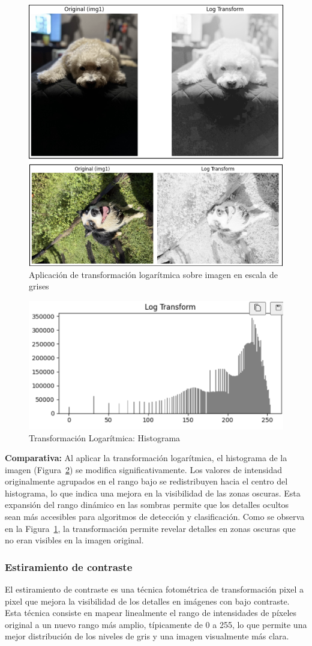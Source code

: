 \documentclass[12pt,letterpaper]{article}
\begin{document}
\begin{figure}[H]
  \centering
  \includegraphics[width=0.5\linewidth]{figuras/transformacion_log.png}
  \caption{Aplicación de transformación logarítmica sobre imagen en escala de grises}
  \label{fig:transformacion_logaritmica}
\end{figure}

\begin{figure}[H]
  \centering
  \includegraphics[width=0.5\linewidth]{figuras/histograma_transformacion_logaritmica.png}
  \caption{Transformación Logarítmica: Histograma}
  \label{fig:histograma_transformacion_logaritmica}
\end{figure}


\textbf{Comparativa:} Al aplicar la transformación logarítmica, el histograma de la imagen (Figura~\ref{fig:histograma_transformacion_logaritmica}) se modifica significativamente. Los valores de intensidad originalmente agrupados en el rango bajo se redistribuyen hacia el centro del histograma, lo que indica una mejora en la visibilidad de las zonas oscuras. Esta expansión del rango dinámico en las sombras permite que los detalles ocultos sean más accesibles para algoritmos de detección y clasificación. Como se observa en la Figura~\ref{fig:transformacion_logaritmica}, la transformación permite revelar detalles en zonas oscuras que no eran visibles en la imagen original.

\subsubsection{Estiramiento de contraste}
El estiramiento de contraste es una técnica fotométrica de transformación pixel a pixel que mejora la visibilidad de los detalles en imágenes con bajo contraste. Esta técnica consiste en mapear linealmente el rango de intensidades de píxeles original a un nuevo rango más amplio, típicamente de 0 a 255, lo que permite una mejor distribución de los niveles de gris y una imagen visualmente más clara.
\end{document}
